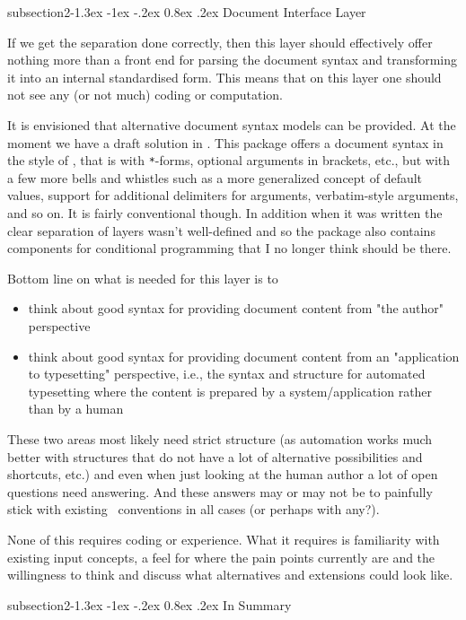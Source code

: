 \documentclass{ltnews}
\makeatletter
\newcommand{\@subheadingfont}{%
   \sffamily\slshape
   \let\LaTeX\cmssLaTeX\let\TeX\cmssTeX
}
\renewcommand{\subsection}{%
   \@startsection
      {subsection}{2}{\z@}{-1.3ex \@plus -1ex \@minus -.2ex}%
      {0.8ex \@plus.2ex}{\@subheadingfont}%
}
\makeatother
\begin{document}
\subsection{Document Interface Layer}

If we get the separation done correctly, then this layer should effectively offer nothing more than a front end for parsing the document syntax and transforming it into an internal standardised form. This means that on this layer one should not see any (or not much) coding or computation.

It is envisioned that alternative document syntax models can be provided.
At the moment we have a draft solution in .
This package offers a document syntax in the style of \LaTeXe, that is with \verb|*|-forms, optional arguments in brackets, etc., but with a few more bells and whistles such as a more generalized concept of default values, support for additional delimiters for arguments, verbatim-style arguments, and so on.
It is fairly conventional though.
In addition when it was written the clear separation of layers wasn't well-defined and so the package also contains components for conditional programming that I no longer think should be there.

Bottom line on what is needed for this layer is to
\begin{itemize}
\item think about good syntax for providing document content from "the author" perspective
\item think about good syntax for providing document content from an "application to typesetting" perspective, i.e., the syntax and structure for automated typesetting where the content is prepared by a system/application rather than by a human
\end{itemize}
These two areas most likely need strict structure (as automation works much better with structures that do not have a lot of alternative possibilities and shortcuts, etc.) and even when just looking at the human author a lot of open questions need answering.
And these answers may or may not be to painfully stick with existing \LaTeXe\ conventions in all cases (or perhaps with any?).

None of this requires coding or  experience. What it requires is familiarity with existing input concepts, a feel for where the pain points currently are and the willingness to think and discuss what alternatives and extensions could look like.

\subsection{In Summary}
\end{document}
